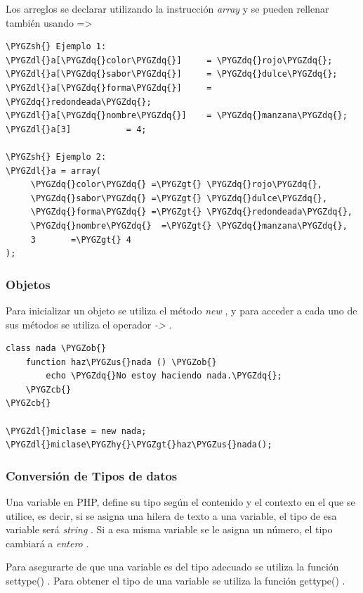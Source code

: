 \documentclass[a5paper,10pt,spanish]{sphinxmanual}
\def\PYGZus{\char`\_}
\def\PYGZob{\char`\{}
\def\PYGZcb{\char`\}}
\def\PYGZgt{\char`\>}
\def\PYGZsh{\char`\#}
\def\PYGZdl{\char`\$}
\def\PYGZhy{\char`\-}
\def\PYGZdq{\char`\"}
\begin{document}
Los arreglos se declarar utilizando la instrucción \emph{array} y se pueden
rellenar también usando =\textgreater{}

\begin{Verbatim}[commandchars=\\\{\}]
\PYGZsh{} Ejemplo 1:
\PYGZdl{}a[\PYGZdq{}color\PYGZdq{}]     = \PYGZdq{}rojo\PYGZdq{};
\PYGZdl{}a[\PYGZdq{}sabor\PYGZdq{}]     = \PYGZdq{}dulce\PYGZdq{};
\PYGZdl{}a[\PYGZdq{}forma\PYGZdq{}]     = \PYGZdq{}redondeada\PYGZdq{};
\PYGZdl{}a[\PYGZdq{}nombre\PYGZdq{}]    = \PYGZdq{}manzana\PYGZdq{};
\PYGZdl{}a[3]           = 4;

\PYGZsh{} Ejemplo 2:
\PYGZdl{}a = array(
     \PYGZdq{}color\PYGZdq{} =\PYGZgt{} \PYGZdq{}rojo\PYGZdq{},
     \PYGZdq{}sabor\PYGZdq{} =\PYGZgt{} \PYGZdq{}dulce\PYGZdq{},
     \PYGZdq{}forma\PYGZdq{} =\PYGZgt{} \PYGZdq{}redondeada\PYGZdq{},
     \PYGZdq{}nombre\PYGZdq{}  =\PYGZgt{} \PYGZdq{}manzana\PYGZdq{},
     3       =\PYGZgt{} 4
);
\end{Verbatim}


\subsubsection{Objetos}
\label{Tutorial1_Conceptos.md:objetos}
Para inicializar un objeto se utiliza el método \emph{new} , y para acceder a
cada uno de sus métodos se utiliza el operador \emph{-\textgreater{}} .

\begin{Verbatim}[commandchars=\\\{\}]
class nada \PYGZob{}
    function haz\PYGZus{}nada () \PYGZob{}
        echo \PYGZdq{}No estoy haciendo nada.\PYGZdq{};
    \PYGZcb{}
\PYGZcb{}

\PYGZdl{}miclase = new nada;
\PYGZdl{}miclase\PYGZhy{}\PYGZgt{}haz\PYGZus{}nada();
\end{Verbatim}


\subsubsection{Conversión de Tipos de datos}
\label{Tutorial1_Conceptos.md:conversion-de-tipos-de-datos}
Una variable en PHP, define su tipo según el contenido y el contexto en
el que se utilice, es decir, si se asigna una hilera de texto a una
variable, el tipo de esa variable será \emph{string} . Si a esa misma
variable se le asigna un número, el tipo cambiará a \emph{entero} .

Para asegurarte de que una variable es del tipo adecuado se utiliza la
función settype() . Para
obtener el tipo de una variable se utiliza la función
gettype() .
\end{document}
